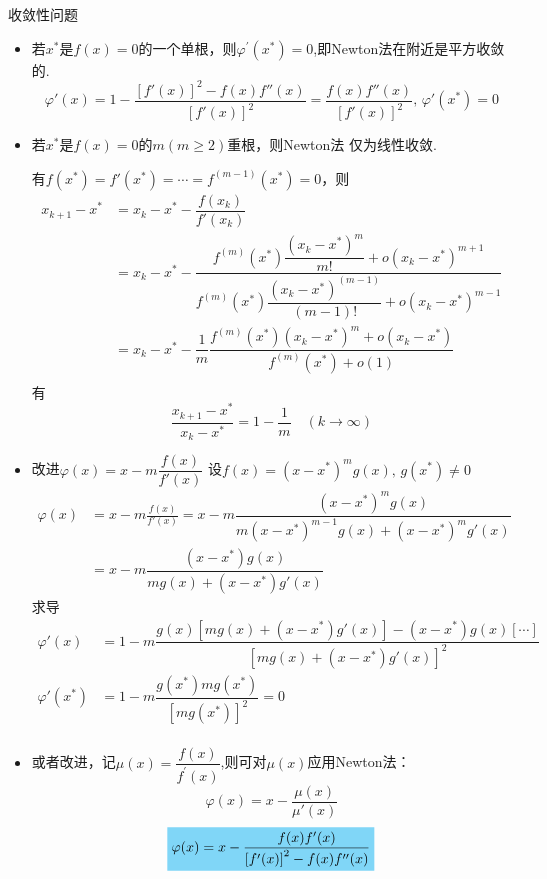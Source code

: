 \begin{note}
    收敛性问题

    \begin{itemize}
        \item 若$x^*$是$f(x)=0$的一个单根，则$\varphi^\prime(x^*)=0$,即Newton法在附近是平方收敛的.
        \[
            \varphi'(x) =1- \dfrac{[f'(x)]^2-f(x)f''(x)}{[f'(x)]^2} = \dfrac{f(x)f''(x)}{[f'(x)]^2},\,\varphi'(x^*) = 0
        \]
        \item 若$x^*$是$f(x)=0$的$m(m\geq 2)$重根，则Newton法
        仅为线性收敛.

        有$f(x^*) = f'(x^*) = \cdots = f^{(m-1)}(x^*) = 0$，则
        \[
            \begin{aligned}
                x_{k+1}-x^* &= x_{k}-x^*-\dfrac{f(x_k)}{f'(x_k)}\\
                &=x_{k}-x^*-\dfrac{f^{(m)}(x^*)\dfrac{(x_k-x^*)^m}{m!}+o(x_k-x^*)^{m+1}}{f^{(m)}(x^*)\dfrac{(x_k-x^*)^{(m-1)}}{(m-1)!}+o(x_k-x^*)^{m-1}}\\
                &=x_{k}-x^*-\dfrac{1}{m}\dfrac{f^{(m)}(x^*){(x_k-x^*)^m}+o(x_k-x^*)}{f^{(m)}(x^*)+o(1)}\\
            \end{aligned}
        \]
        有
        \[
            \dfrac{x_{k+1}-x^*}{x_k-x^*} = 1-\dfrac{1}{m}\quad (k\to \infty)
        \]
        \item 改进$\varphi(x) = x-m\dfrac{f(x)}{f'(x)}$
        设$f(x) = (x-x^*)^mg(x),\,g(x^*)\neq 0$
        \[
            \begin{aligned}
                \varphi(x)
                &=x-m\frac{f(x)}{f'(x)} = x-m\dfrac{(x-x^*)^mg(x)}{m(x-x^*)^{m-1}g(x)+(x-x^*)^mg'(x)}\\
                &=x-m\dfrac{(x-x^*)g(x)}{mg(x)+(x-x^*)g'(x)}
            \end{aligned}
        \]
        求导
        \[
            \begin{aligned}
                \varphi'(x)
                &=1-m\dfrac{g(x)[mg(x)+(x-x^*)g'(x)]-(x-x^*)g(x)[\cdots]}{[mg(x)+(x-x^*)g'(x)]^2}\\
                \varphi'(x^*)
                &=1-m\dfrac{g(x^*)mg(x^*)}{[mg(x^*)]^2} = 0\\
            \end{aligned}
        \]
        \item 或者改进，记$\mu(x)=\dfrac{f(x)}{f^{\prime}(x)}$,则可对$\mu(x)$应用Newton法：
        \[
            \varphi(x) = x-\dfrac{\mu(x)}{\mu'(x)}
        \]
        \[
            \colorbox{cyan!50}{$\varphi(x)=x-\dfrac{f(x)f'(x)}{\left[f'(x)\right]^2-f(x)f''(x)}$}
        \]
    \end{itemize}
\end{note}
